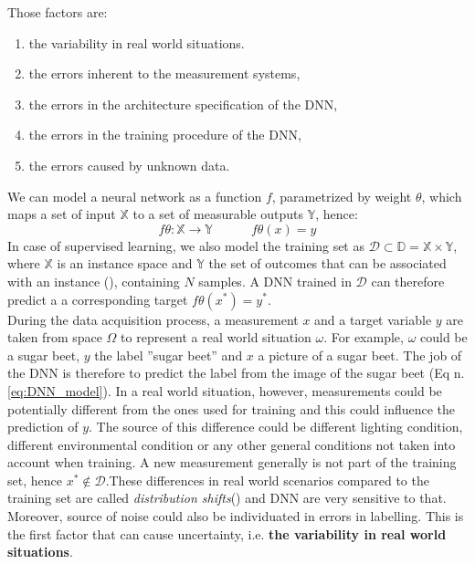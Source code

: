 Those factors are:

\begin{enumerate}[label=\Roman*.]
    \item the variability in real world situations. 
    \item the errors inherent to the measurement systems,
    \item the errors in the architecture specification of the DNN,
    \item the errors in the training procedure of the DNN,
    \item the errors caused by unknown data.
\end{enumerate}
We can model a neural network as a function $f$, parametrized by weight $\theta$, which maps a set of input $\mathbb{X}$ to a set of measurable outputs $\mathbb{Y}$, hence:
\begin{equation}
    f\theta : \mathbb{X} \rightarrow \mathbb{Y} \quad\quad\quad
    f\theta(x) = y
    \label{eq:DNN_model}
\end{equation}
In case of supervised learning, we also model the training set as $\mathcal{D} \subset \mathbb{D} = \mathbb{X} \times \mathbb{Y}$, where $\mathbb{X}$ is an instance space and $\mathbb{Y}$ the set of outcomes that can be associated with an instance (\cite{uncertainity_classi}), containing $N$ samples. A DNN trained in $\mathcal{D}$ can therefore predict a a corresponding target $f\theta(x^*) = y^*$.\\
During the data acquisition process, a measurement $x$ and a target variable $y$ are taken from space $\Omega$ to  represent a real world situation $\omega$. For example, $\omega$ could be a sugar beet, $y$ the label ''sugar beet'' and $x$ a picture of a sugar beet. The job of the DNN is therefore to predict the label from the image of the sugar beet (Eq n. \ref{eq:DNN_model}). In a real world situation, however, measurements could be potentially different from the ones used for training and this could influence the prediction of $y$. The source of this difference could be different lighting condition, different environmental condition or any other general conditions not taken into account when training. A new measurement generally is not part of the training set, hence $x^* \notin \mathcal{D}$.These differences in real world scenarios compared to the training set are called \textit{distribution shifts}(\cite{ovadia2019trust}) and DNN are very sensitive to that. Moreover, source of noise could also be individuated in errors in labelling. This is the first factor that can cause uncertainty, i.e. \textbf{the variability in real world situations}. \cite{gawlikowski2021survey}\\
